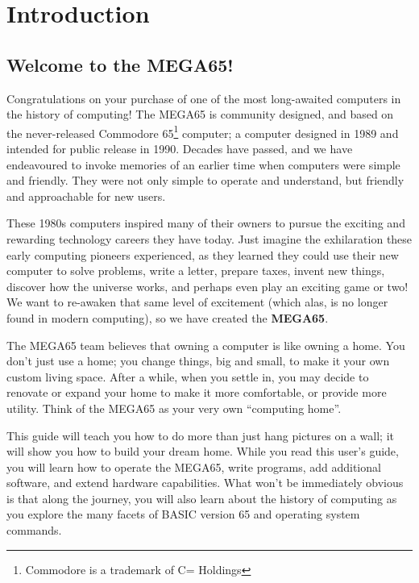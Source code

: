 \chapter{Introduction}


\section{Welcome to the MEGA65!}

Congratulations on your purchase of one of the most long-awaited computers in the history of computing! The MEGA65 is community designed, and based on the never-released Commodore{\textregistered} 65\footnote{Commodore is a trademark of C= Holdings} computer; a computer designed in 1989 and intended for public release in 1990. Decades have passed, and we have endeavoured to invoke memories of an earlier time when computers were simple and friendly. They were not only simple to operate and understand, but friendly and approachable for new users.

These 1980s computers inspired many of their owners to pursue the exciting and rewarding technology careers they have today. Just imagine the exhilaration these early computing pioneers experienced, as they learned they could use their new computer to solve problems, write a letter, prepare taxes, invent new things, discover how the universe works, and perhaps even play an exciting game or two! We want to re-awaken that same level of excitement (which alas, is no longer found in modern computing), so we have created the {\bf MEGA65}.

The MEGA65 team believes that owning a computer is like owning a home. You don't just use a home; you change things, big and small, to make it your own custom living space. After a while, when you settle in, you may decide to renovate or expand your home to make it more comfortable, or provide more utility. Think of the MEGA65 as your very own ``computing home''.

This guide will teach you how to do more than just hang pictures on a wall; it will show you how to build your dream home. While you read this user's guide, you will learn how to operate the MEGA65, write programs, add additional software, and extend hardware capabilities. What won't be immediately obvious is that along the journey, you will also learn about the history of computing as you explore the many facets of BASIC version 65 and operating system commands.

